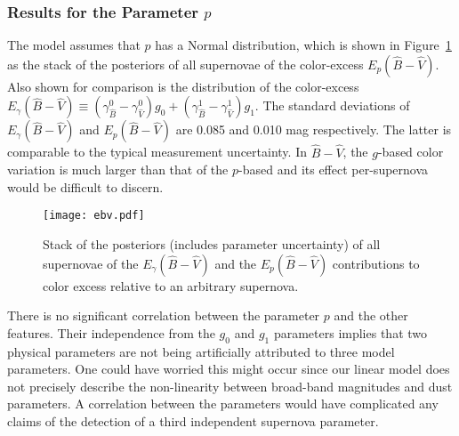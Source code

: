 \documentclass[trackchanges]{aastex62}   	%
\begin{document}
\subsubsection{Results for the Parameter $p$}
\label{p:sec}
The model assumes that $p$ has a Normal distribution, which is shown in Figure~\ref{ebv3:fig} as the 
stack of the posteriors of all supernovae of the color-excess $E_p({\hat{B}}-{\hat{V}})$.
Also shown for comparison is the distribution of
the   color-excess $E_\gamma({\hat{B}}-{\hat{V}}) \equiv (\gamma^0_{\hat{B}} -\gamma^0_{\hat{V}}) g_0
+ (\gamma^1_{\hat{B}} -\gamma^1_{\hat{V}}) g_1$.
The standard deviations of  $E_\gamma({\hat{B}}-{\hat{V}})$ and $E_p({\hat{B}}-{\hat{V}})$ are
0.085 %
and 0.010
mag respectively.
The latter is comparable to the typical measurement uncertainty.
In $\hat{B}-\hat{V}$, 
the $g$-based color variation is much larger than that of the $p$-based and its effect per-supernova would be difficult to discern.

\begin{figure}[htbp] %
   \centering
   \texttt{[image: ebv.pdf]}
      \caption{Stack of the posteriors  (includes parameter uncertainty) of all supernovae of the  $E_{\gamma}({\hat{B}}-{\hat{V}})$ 
      and the 
 $E_p({\hat{B}}-{\hat{V}})$  contributions to color excess relative to an arbitrary supernova.
   \label{ebv3:fig}}
\end{figure}


There is no significant correlation between the parameter $p$ and the other features.
Their independence from the  $g_0$ and $g_1$ parameters
implies that two physical parameters are not being artificially attributed to three
model parameters.  One could have
worried this might
occur since our linear model does not precisely
describe the non-linearity between broad-band magnitudes and dust parameters. A
correlation 
between the parameters would have complicated any claims of the detection of a third independent supernova parameter.
\end{document}
